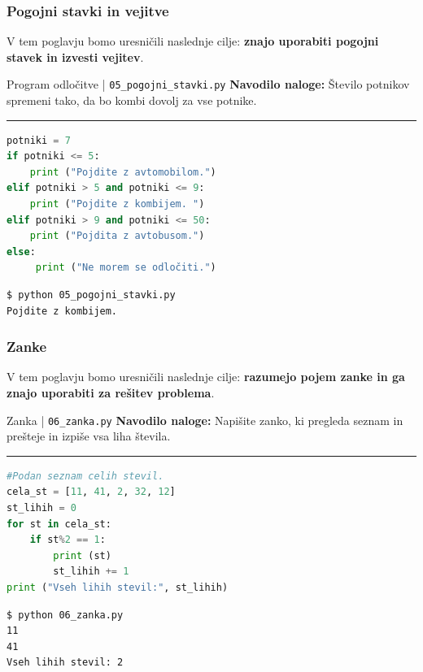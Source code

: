\subsubsection{Pogojni stavki in vejitve}
\label{sec:pogojni_stavki_vejitve}

V tem poglavju bomo uresničili naslednje cilje: \textbf{znajo
  uporabiti pogojni stavek in izvesti vejitev}.

\begin{examplebox}[label={prog:pogojni}]{Program odločitve |
    \texttt{05\_pogojni\_stavki.py} \cite{web:PTHardWay}}
\textbf{Navodilo naloge:}
Število potnikov spremeni tako, da bo kombi dovolj za vse potnike. 
\rule{\textwidth}{.4pt}
\begin{lstlisting}[language=Python]
potniki = 7
if potniki <= 5:
    print ("Pojdite z avtomobilom.")
elif potniki > 5 and potniki <= 9:
    print ("Pojdite z kombijem. ")
elif potniki > 9 and potniki <= 50:
    print ("Pojdita z avtobusom.")
else:
     print ("Ne morem se odločiti.")
\end{lstlisting}
\tcblower
\begin{Verbatim}[fontsize=\footnotesize]
$ python 05_pogojni_stavki.py
Pojdite z kombijem.
\end{Verbatim}
\end{examplebox}

\subsubsection{Zanke}
\label{sec:zanke}

V tem poglavju bomo uresničili naslednje cilje: \textbf{razumejo pojem zanke
in ga znajo uporabiti za rešitev problema}.

\begin{examplebox}[label={prog:zanka}]{Zanka |
    \texttt{06\_zanka.py} \cite{web:PTHardWay}}
  \textbf{Navodilo naloge:}
  Napišite zanko, ki pregleda seznam in prešteje in izpiše vsa liha
  števila.
\rule{\textwidth}{.4pt}
\begin{lstlisting}[language=Python]
#Podan seznam celih stevil.
cela_st = [11, 41, 2, 32, 12]
st_lihih = 0
for st in cela_st:
    if st%2 == 1:
        print (st)
        st_lihih += 1
print ("Vseh lihih stevil:", st_lihih)
\end{lstlisting}
\tcblower
\begin{Verbatim}[fontsize=\footnotesize]
$ python 06_zanka.py
11
41
Vseh lihih stevil: 2
\end{Verbatim}
\end{examplebox}

